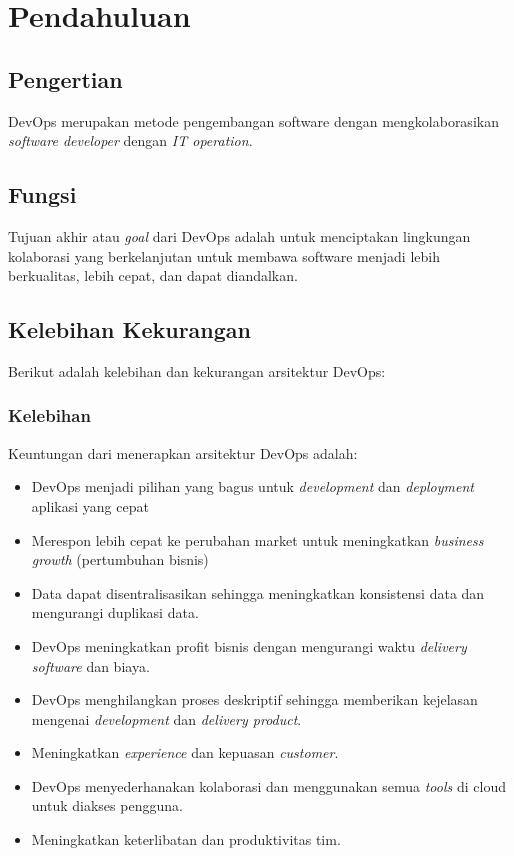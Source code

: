 \chapter{Pendahuluan}
\author{Hendra Lijaya, Oktavianus Hendry Wijaya}

\section{Pengertian}
DevOps merupakan metode pengembangan software dengan mengkolaborasikan \textit{software developer} dengan \textit{IT operation}. 
\section{Fungsi}
Tujuan akhir atau \textit{goal} dari DevOps adalah untuk menciptakan lingkungan kolaborasi yang berkelanjutan untuk membawa software menjadi lebih berkualitas, lebih cepat, dan dapat diandalkan.
\section{Kelebihan Kekurangan}
Berikut adalah kelebihan dan kekurangan arsitektur DevOps:

\subsection{Kelebihan}
Keuntungan dari menerapkan arsitektur DevOps adalah:
\begin{itemize}
	\item DevOps menjadi pilihan yang bagus untuk \textit{development} dan \textit{deployment} aplikasi yang cepat
	\item Merespon lebih cepat ke perubahan market untuk meningkatkan \textit{business growth} (pertumbuhan bisnis)
	\item Data dapat disentralisasikan sehingga meningkatkan konsistensi data dan mengurangi duplikasi data.
	\item  DevOps meningkatkan profit bisnis dengan mengurangi waktu \textit{delivery software} dan biaya.
	\item DevOps menghilangkan proses deskriptif sehingga memberikan kejelasan mengenai \textit{development} dan \textit{delivery product}.
	\item Meningkatkan \textit{experience} dan kepuasan \textit{customer}.
	\item DevOps menyederhanakan kolaborasi dan menggunakan semua \textit{tools} di cloud untuk diakses pengguna.
	\item Meningkatkan keterlibatan dan produktivitas tim.
\end{itemize}
